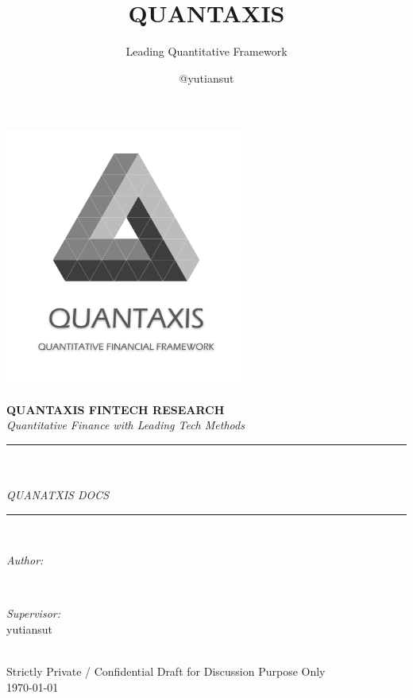 \documentclass{scrartcl}
\numberwithin{equation}{section}
\begin{document}
\title{QUANTAXIS}%
\subtitle{Leading Quantitative Framework}
\author{@yutiansut}
\begin{titlepage}
    \newcommand{\HRule}{\rule{\linewidth}{0.5mm}}
    \includegraphics[width=8cm]{qalogo.png}\\[1cm]
    \center
    \quad\\[1.5cm]
    \textbf{\Large  QUANTAXIS FINTECH RESEARCH }\\[0.5cm]
    \textsl{\large Quantitative Finance with Leading Tech Methods}\\[0.5cm]

    \makeatletter
    \HRule \\[0.4cm]
    { \huge \bfseries \@title}\\[0.4cm]
    \textsl{\large QUANATXIS DOCS}\\[0.5cm]
    \HRule \\[1.5cm]
    \begin{minipage}{0.4\textwidth}
        \begin{flushleft} \large
            \emph{Author:}\\
            \@author
        \end{flushleft}
    \end{minipage}
    ~
    \begin{minipage}{0.4\textwidth}
        \begin{flushright} \large
            \emph{Supervisor:} \\
            \textup{yutiansut}
        \end{flushright}
    \end{minipage}\\[2cm]
    \makeatother
    {\large Strictly Private / Confidential Draft for Discussion Purpose Only}\\[0.5cm]
    {\large \today}\\[1cm]
    \vfill
\end{titlepage}
\end{document}
